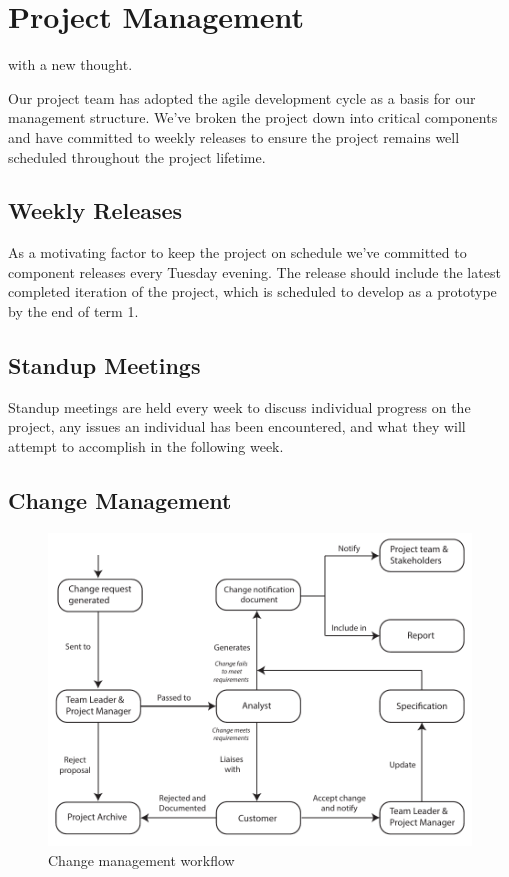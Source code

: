 \chapter[Project Management]{Project Management}
\label{ch:management}


 with a new thought.

Our project team has adopted the agile development cycle as a basis for our management structure. We've broken the project down into critical components and have committed to weekly releases to ensure the project remains well scheduled throughout the project lifetime.




\section{Weekly Releases}
As a motivating factor to keep the project on schedule we've committed to component releases every Tuesday evening. The release should include the latest completed iteration of the project, which is scheduled to develop as a prototype by the end of term 1.

\section{Standup Meetings}
Standup meetings are held every week to discuss individual progress on the project, any issues an individual has been encountered, and what they will attempt to accomplish in the following week.

\section{Change Management}
\begin{figure}[h!]
\includegraphics{"res/Change management diagram"}
\caption{Change management workflow}
\end{figure}
